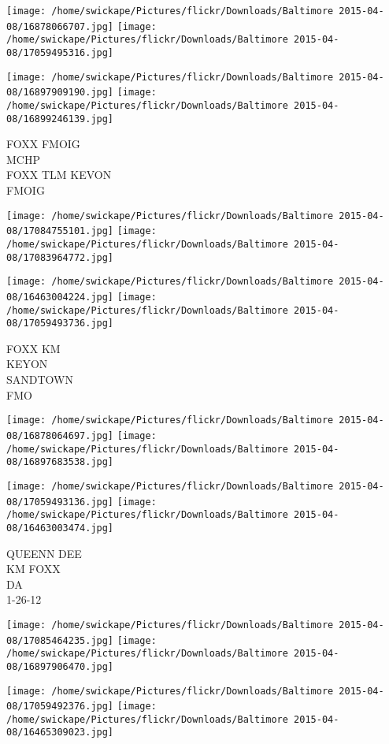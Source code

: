 \documentclass[10pt,letterpaper]{article}
\begin{document}
\texttt{[image: /home/swickape/Pictures/flickr/Downloads/Baltimore 2015-04-08/16878066707.jpg]}
\texttt{[image: /home/swickape/Pictures/flickr/Downloads/Baltimore 2015-04-08/17059495316.jpg]}

\texttt{[image: /home/swickape/Pictures/flickr/Downloads/Baltimore 2015-04-08/16897909190.jpg]}
\texttt{[image: /home/swickape/Pictures/flickr/Downloads/Baltimore 2015-04-08/16899246139.jpg]}

FOXX FMOIG\\
MCHP\\
FOXX TLM KEVON\\
FMOIG
\pagebreak

\texttt{[image: /home/swickape/Pictures/flickr/Downloads/Baltimore 2015-04-08/17084755101.jpg]}
\texttt{[image: /home/swickape/Pictures/flickr/Downloads/Baltimore 2015-04-08/17083964772.jpg]}

\texttt{[image: /home/swickape/Pictures/flickr/Downloads/Baltimore 2015-04-08/16463004224.jpg]}
\texttt{[image: /home/swickape/Pictures/flickr/Downloads/Baltimore 2015-04-08/17059493736.jpg]}

FOXX KM\\
KEYON\\
SANDTOWN\\
FMO
\pagebreak

\texttt{[image: /home/swickape/Pictures/flickr/Downloads/Baltimore 2015-04-08/16878064697.jpg]}
\texttt{[image: /home/swickape/Pictures/flickr/Downloads/Baltimore 2015-04-08/16897683538.jpg]}

\texttt{[image: /home/swickape/Pictures/flickr/Downloads/Baltimore 2015-04-08/17059493136.jpg]}
\texttt{[image: /home/swickape/Pictures/flickr/Downloads/Baltimore 2015-04-08/16463003474.jpg]}

QUEENN DEE\\
KM FOXX\\
DA\\
1{-}26{-}12
\pagebreak

\texttt{[image: /home/swickape/Pictures/flickr/Downloads/Baltimore 2015-04-08/17085464235.jpg]}
\texttt{[image: /home/swickape/Pictures/flickr/Downloads/Baltimore 2015-04-08/16897906470.jpg]}

\texttt{[image: /home/swickape/Pictures/flickr/Downloads/Baltimore 2015-04-08/17059492376.jpg]}
\texttt{[image: /home/swickape/Pictures/flickr/Downloads/Baltimore 2015-04-08/16465309023.jpg]}
\end{document}

